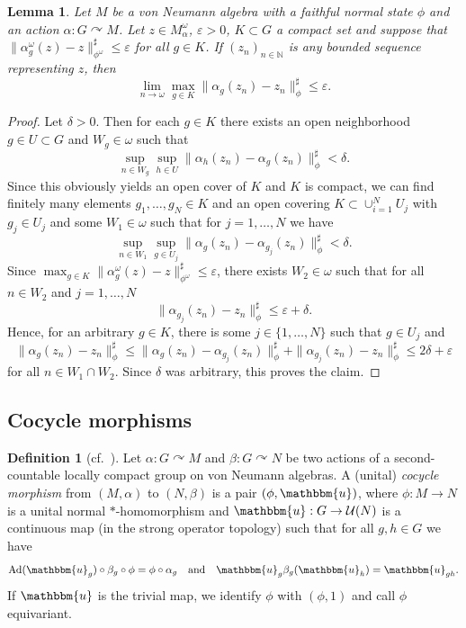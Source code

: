 \documentclass[11pt,a4paper]{article}
\newtheorem{lemma}[theorem]{Lemma}
\theoremstyle{definition}
\newtheorem{definition}[theorem]{Definition}
\theoremstyle{remark}
\numberwithin{equation}{section}
\numberwithin{theorem}{section}
\newcommand{\N}{\mathbb{N}}
\newcommand{\acts}{\curvearrowright}
\newcommand{\e}{\varepsilon}
\begin{document}
\begin{lemma} \label{lemma:lifting_invariance_compact_sets}
Let $M$ be a von Neumann algebra with a faithful normal state $\phi$ and an action $\alpha\colon G \acts M$. 
Let $z \in M_\alpha^\omega$, $\e >0$, $K \subset G$ a compact set and suppose that $\| \alpha_g^\omega(z)-z\|_{\phi^\omega}^\sharp \leq \e$ for all $g \in K$.
If $(z_n)_{n\in \N}$ is any bounded sequence representing $z$, then 
\[
\lim_{n \rightarrow \omega} \max_{g \in K} \| \alpha_g(z_n)-z_n\|_\phi^\sharp \leq \e.
\]
\end{lemma}
\begin{proof}
Let $\delta>0$.
Then for each $g \in K$ there exists an open neighborhood $g \in U \subset G$ and $W_g \in \omega$ such that
\[\sup_{n \in W_g}\sup_{h \in U}\|\alpha_h(z_n) - \alpha_g(z_n)\|_\phi^\sharp < \delta.\]
Since this obviously yields an open cover of $K$ and $K$ is compact, we can find finitely many elements $g_1, \hdots, g_N \in K$ and an open covering $K \subset \cup_{i=1}^N U_j$ with $g_j \in U_j$ and some $W_1 \in \omega$ such that for $j=1, \hdots, N$ we have
\[\sup_{n \in W_1}\sup_{g \in U_j}\|\alpha_{g}(z_n) - \alpha_{g_j}(z_n)\|_\phi^\sharp < \delta.\]
Since $\max_{g \in K}\| \alpha_g^\omega(z)-z\|_{\phi^\omega}^\sharp \leq \e$, there exists $W_2 \in \omega$ such that for all $n \in W_2$ and $j=1, \hdots, N$ 
\[\|\alpha_{g_j}(z_n) - z_n\|_\phi^\sharp \leq \e+\delta.\]
Hence, for an arbitrary $g \in K$, there is some $j \in \{1, \hdots, N\}$ such that $g \in U_j$ and
\[\| \alpha_g(z_n)-z_n\|_\phi^\sharp \leq \|\alpha_g(z_n) - \alpha_{g_j}(z_n)\|_\phi^\sharp + \|\alpha_{g_j}(z_n) - z_n\|_\phi^\sharp \leq 2\delta+ \e\]
for all $n \in W_1 \cap W_2.$
Since $\delta$ was arbitrary, this proves the claim. 
\end{proof}

\subsection{Cocycle morphisms}

\begin{definition}[cf.\ {\cite[Definition 1.10]{Szabo21cc}}]
Let $\alpha\colon G \acts M$ and $\beta\colon G \acts N$ be two actions of a second-countable locally compact group on von Neumann algebras. 
A (unital) \emph{cocycle morphism} from $(M,\alpha)$ to $(N,\beta)$ is a pair $(\phi,\mathbbm{u})$, where $\phi\colon M \rightarrow N$ is a unital normal $*$-homomorphism and $\mathbbm{u}:G\rightarrow \mathcal{U}(N)$ is a continuous map (in the strong operator topology) such that for all $g,h \in G$ we have
\[
\mathrm{Ad}(\mathbbm{u}_g) \circ \beta_g \circ \phi = \phi \circ \alpha_g \quad\text{and}\quad \mathbbm{u}_g \beta_g(\mathbbm{u}_h) = \mathbbm{u}_{gh}.
\]
If $\mathbbm{u}$ is the trivial map, we identify $\phi$ with $(\phi,1)$ and call $\phi$ equivariant.
\end{definition}
\end{document}
